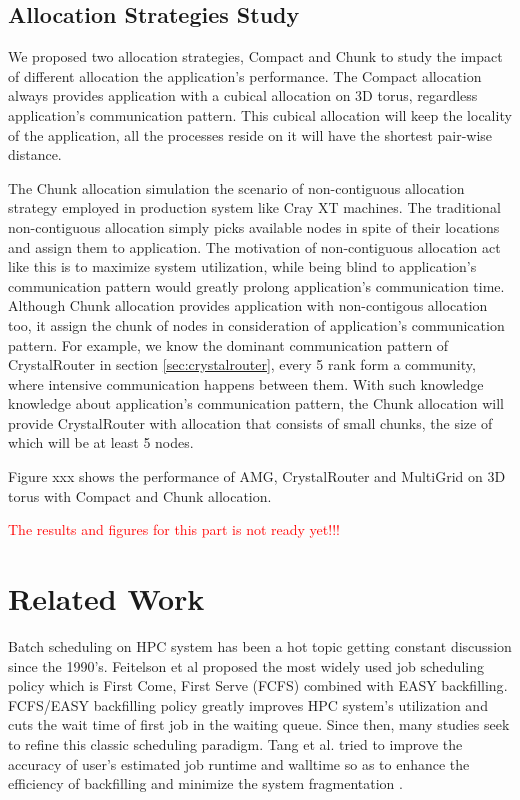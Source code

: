 \documentclass[conference]{IEEEtran}
\begin{document}
\subsection{Allocation Strategies Study}
\label{sec: alloc strategy study}

We proposed two allocation strategies, Compact and Chunk to study the impact of different allocation the application's performance. The Compact allocation always provides application with a cubical allocation on 3D torus, regardless application's communication pattern. This cubical allocation will keep the locality of the application, all the processes reside on it will have the shortest pair-wise distance. 

The Chunk allocation simulation the scenario of non-contiguous allocation strategy employed in production system like Cray XT machines. The traditional non-contiguous allocation simply picks available nodes in spite of their locations and assign them to application. The motivation of non-contiguous allocation act like this is to maximize system utilization, while being blind to application's communication pattern would greatly prolong application's communication time. Although Chunk allocation provides application with non-contigous allocation too, it assign the chunk of nodes in consideration of application's communication pattern. For example, we know the dominant communication pattern of CrystalRouter in section \ref{sec:crystalrouter}, every 5 rank form a community, where intensive communication happens between them. With such knowledge knowledge about application's communication pattern, the Chunk allocation will provide CrystalRouter with allocation that consists of small chunks, the size of which will be at least 5 nodes. 

Figure xxx shows the performance of AMG, CrystalRouter and MultiGrid on 3D torus with Compact and Chunk allocation. 


\textcolor{red}{The results and figures for this part is not ready yet!!!}




\section{Related Work}
\label{sec:related_work}
Batch scheduling on HPC system has been a hot topic getting constant discussion since the 1990's.
Feitelson et al proposed the most widely used job scheduling policy which is First Come, First Serve (FCFS) combined with 
EASY backfilling\cite{feit}. FCFS/EASY backfilling policy greatly improves HPC system's utilization and cuts the wait time 
of first job in the waiting queue. Since then, many studies seek to refine this classic scheduling paradigm. Tang et al. 
tried to improve the accuracy of user's estimated job runtime and walltime so as to enhance the efficiency of backfilling and  minimize the system fragmentation\cite{wei-ipdps2010} \cite{wei-jpdc2013} \cite{wei-ipdps2011}. %
\end{document}
